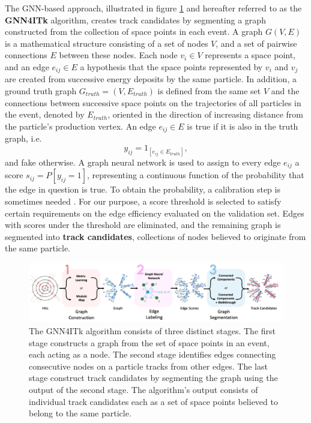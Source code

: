 The GNN-based approach, illustrated in figure \ref{fig:gnn4itk} and hereafter referred to as the \textbf{GNN4ITk} algorithm, creates track candidates by segmenting a graph constructed from the collection of space points in each event. 
A graph $G(V,E)$ is a mathematical structure consisting of a set of nodes $V$, and a set of pairwise connections $E$ between these nodes. 
Each node $v_i \in V$ represents a space point, and an edge $e_{ij} \in E$ a hypothesis that the space points represented by $v_i$ and $v_j$ are created from successive energy deposits by the same particle. 
In addition, a ground truth graph $G_{truth}= (V, E_{truth})$ is defined from the same set $V$ and the connections between successive space points on the trajectories of all particles in the event, denoted by $E_{truth}$, oriented in the direction of increasing distance from the particle's production vertex. 
An edge $e_{ij}\in E$ is true if it is also in the truth graph, i.e. 
\begin{equation}
\label{eq:9.1}
y_{ij} = 1_{[e_{ij} \in E_{truth}]},
\end{equation}
and fake otherwise. 
A graph neural network is used to assign to every edge $e_{ij} $ a score $s_{ij} = P[y_{ij} = 1]$, representing a continuous function of the probability that the edge in question is true.
To obtain the probability, a calibration step is sometimes needed \cite{Feng_2022}. 
For our purpose, a score threshold is selected to satisfy certain requirements on the edge efficiency evaluated on the validation set.
Edges with scores under the threshold are eliminated, and the remaining graph is segmented into \textbf{track candidates}, collections of nodes believed to originate from the same particle.

\begin{figure}[h!]
    \centering
    \includegraphics[width=\textwidth]{figures/gnn4itk.png}
    \caption{The GNN4ITk algorithm consists of three distinct stages. The first stage constructs a graph from the set of space points in an event, each acting as a node. The second stage identifies edges connecting consecutive nodes on a particle tracks from other edges. The last stage construct track candidates by segmenting the graph using the output of the second stage. The algorithm's output consists of individual track candidates each as a set of space points believed to belong to the same particle.}
    \label{fig:gnn4itk}
\end{figure}

